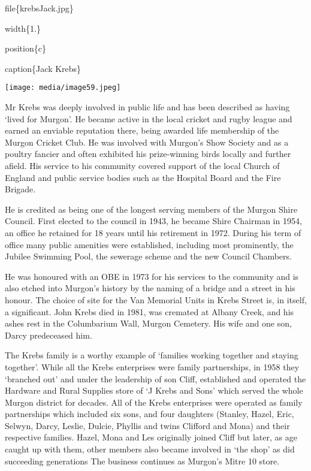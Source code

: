 file\{krebsJack.jpg\}

width\{1.\}

position\{c\}

caption\{Jack Krebs\}

\texttt{[image: media/image59.jpeg]}

Mr Krebs was deeply involved in public life and has been described as having `lived for Murgon'. He became active in the local cricket and rugby league and earned an enviable reputation there, being awarded life membership of the Murgon Cricket Club. He was involved with Murgon's Show Society and as a poultry fancier and often exhibited his prize-winning birds locally and further afield. His service to his community covered support of the local Church of England and public service bodies such as the Hospital Board and the Fire Brigade.

He is credited as being one of the longest serving members of the Murgon Shire Council. First elected to the council in 1943, he became Shire Chairman in 1954, an office he retained for 18 years until his retirement in 1972. During his term of office many public amenities were established, including most prominently, the Jubilee Swimming Pool, the sewerage scheme and the new Council Chambers.

He was honoured with an OBE in 1973 for his services to the community and is also etched into Murgon's history by the naming of a bridge and a street in his honour. The choice of site for the Van Memorial Units in Krebs Street is, in itself, a significant. John Krebs died in 1981, was cremated at Albany Creek, and his ashes rest in the Columbarium Wall, Murgon Cemetery. His wife and one son, Darcy predeceased him.

The Krebs family is a worthy example of `families working together and staying together'. While all the Krebs enterprises were family partnerships, in 1958 they `branched out' and under the leadership of son Cliff, established and operated the Hardware and Rural Supplies store of `J Krebs and Sons' which served the whole Murgon district for decades. All of the Krebs enterprises were operated as family partnerships which included six sons, and four daughters (Stanley, Hazel, Eric, Selwyn, Darcy, Leslie, Dulcie, Phyllis and twins Clifford and Mona) and their respective families. Hazel, Mona and Les originally joined Cliff but later, as age caught up with them, other members also became involved in `the shop' as did succeeding generations The business continues as Murgon's Mitre 10 store.


